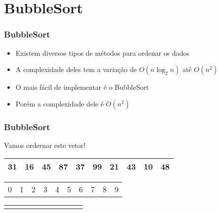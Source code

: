 \documentclass{beamer}
\begin{document}
\section{BubbleSort}

\begin{frame}
	\frametitle{BubbleSort}
    \begin{itemize}[<+->]
        \item Existem diversos tipos de métodos para ordenar os dados
        \item A complexidade deles tem a variação de $O(n\log_2 n)$ até $O(n^2)$
        \item O mais fácil de implementar é o BubbleSort
        \item Porém a complexidade dele é $O(n^2)$
    \end{itemize}
\end{frame}

\begin{frame}
    \frametitle{BubbleSort}
    \begin{center}
        \LARGE{Vamos ordernar este vetor!}
    \end{center}
    \begin{center}
        \begin{table}
            \begin{tabular}{| p{0.25cm} | p{0.25cm} | p{0.25cm} | p{0.25cm} | p{0.25cm} | p{0.25cm} | p{0.25cm} | p{0.25cm} | p{0.25cm} | p{0.25cm} |}
                \hline
                31 & 16 & 45 & 87 & 37 & 99 & 21 & 43 & 10 & 48 \\ \hline
            \end{tabular}
            \begin{tabular}{p{0.25cm} p{0.25cm} p{0.25cm} p{0.25cm} p{0.25cm} p{0.25cm} p{0.25cm} p{0.25cm} p{0.25cm} p{0.25cm}}
                0 & 1 & 2 & 3 & 4 & 5 & 6 & 7 & 8 & 9
            \end{tabular}
            \begin{tabular}{p{0.25cm} p{0.25cm} p{0.25cm} p{0.25cm} p{0.25cm} p{0.25cm} p{0.25cm} p{0.25cm} p{0.25cm} p{0.25cm}}
                & & & & & & & & &
            \end{tabular}
        \end{table}
	\end{center}
\end{frame}
\end{document}
